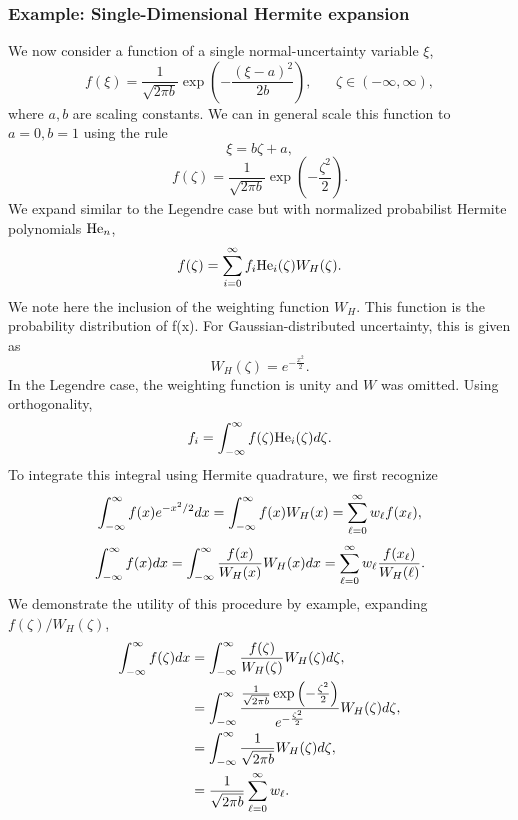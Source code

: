 \subsubsection{Example: Single-Dimensional Hermite expansion}
We now consider a function of a single normal-uncertainty variable $\xi$,
\begin{equation}
f(\xi)=\frac{1}{\sqrt{2\pi b}}\exp\left(-\frac{(\xi-a)^2}{2b}\right),\hspace{20pt}\zeta\in(-\infty,\infty),
\end{equation}
where $a,b$ are scaling constants.  We can in general scale this function to $a=0,b=1$ using the rule
\begin{equation}
\xi=b\zeta+a,
\end{equation}
\begin{equation}
f(\zeta)=\frac{1}{\sqrt{2\pi b}}\exp\left(-\frac{\zeta^2}{2}\right).
\end{equation}
We expand similar to the Legendre case but with normalized probabilist Hermite polynomials $\mbox{He}_n$,
\begin{equation}
f(\zeta)=\sum_{i=0}^\infty f_i \mbox{He}_i(\zeta)W_H(\zeta).
\end{equation}
We note here the inclusion of the weighting function $W_H $.  This function is the probability distribution of f(x).  For Gaussian-distributed uncertainty, this is given as
\begin{equation}
W_H(\zeta)=e^{-\frac{x^2}{2}}.
\end{equation}
In the Legendre case, the weighting function is unity and $W$ was omitted.
Using orthogonality,
\begin{equation}
f_i=\int_{-\infty}^\infty f(\zeta)\mbox{He}_i(\zeta)d\zeta.
\end{equation}
To integrate this integral using Hermite quadrature, we first recognize
\begin{equation}
\int_{-\infty}^\infty f(x)e^{-x^2/2}dx=\int_{-\infty}^\infty f(x)W_H(x)=\sum_{\ell=0}^\infty w_\ell f(x_\ell),
\end{equation}
\begin{equation}
\int_{-\infty}^\infty f(x)dx=\int_{-\infty}^\infty \frac{f(x)}{W_H(x)}W_H(x)dx=\sum_{\ell=0}^\infty w_\ell \frac{f(x_\ell)}{W_H(\ell)}.
\end{equation}
We demonstrate the utility of this procedure by example, expanding $f(\zeta)/W_H(\zeta)$,
\begin{align}
\int_{-\infty}^\infty f(\zeta)dx&=\int_{-\infty}^\infty \frac{f(\zeta)}{W_H(\zeta)}W_H(\zeta)d\zeta,\\
&=\int_{-\infty}^\infty \frac{\frac{1}{\sqrt{2\pi b}}\exp\left(-\frac{\zeta^2}{2}\right)}{e^{-\frac{\zeta^2}{2}}}W_H(\zeta)d\zeta,\\
&=\int_{-\infty}^\infty \frac{1}{\sqrt{2\pi b}} W_H(\zeta)d\zeta,\\
&=\frac{1}{\sqrt{2\pi b}}\sum_{\ell=0}^\infty w_\ell.
\end{align}
